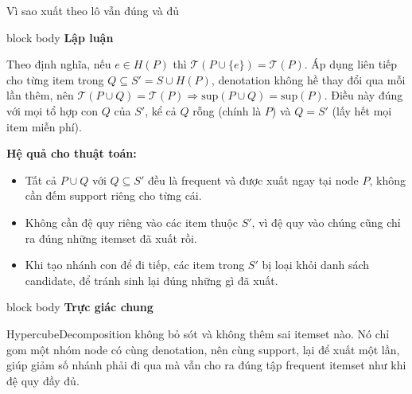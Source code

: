 \documentclass[9pt, aspectratio=169]{beamer}
\newenvironment{quietblock}[1]{%
  \begin{beamercolorbox}[wd=\linewidth,sep=5pt,rounded=true]{block body}
  {\color{psdearblue}\bfseries #1}\par\vspace{2pt}\footnotesize
}{%
  \end{beamercolorbox}
}
\begin{document}
\begin{frame}{Vì sao xuất theo lô vẫn đúng và đủ}
  \begin{quietblock}{Lập luận}
    Theo định nghĩa, nếu $e\in H(P)$ thì $\mathcal T(P\cup\{e\})=\mathcal
    T(P)$. Áp dụng liên tiếp cho từng item trong $Q\subseteq S'=S\cup H(P)$,
    denotation không hề thay đổi qua mỗi lần thêm, nên $\mathcal T(P\cup
    Q)=\mathcal T(P) \Rightarrow \mathrm{sup}(P\cup Q)=\mathrm{sup}(P)$.
    Điều này đúng với mọi tổ hợp con $Q$ của $S'$, kể cả $Q$ rỗng (chính là
    $P$) và $Q=S'$ (lấy hết mọi item miễn phí).
  \end{quietblock}

  \vspace{0.2cm}
  \small
  \textbf{Hệ quả cho thuật toán:}
  \begin{itemize}
    \item Tất cả $P\cup Q$ với $Q\subseteq S'$ đều là frequent và được xuất
      ngay tại node $P$, không cần đếm support riêng cho từng cái.
    \item Không cần đệ quy riêng vào các item thuộc $S'$, vì đệ quy vào
      chúng cũng chỉ ra đúng những itemset đã xuất rồi.
    \item Khi tạo nhánh con để đi tiếp, các item trong $S'$ bị loại khỏi
      danh sách candidate, để tránh sinh lại đúng những gì đã xuất.
  \end{itemize}

  \vspace{0.15cm}
  \begin{quietblock}{Trực giác chung}
    HypercubeDecomposition không bỏ sót và không thêm sai itemset nào. Nó
    chỉ gom một nhóm node có cùng denotation, nên cùng support, lại để xuất
    một lần, giúp giảm số nhánh phải đi qua mà vẫn cho ra đúng tập frequent
    itemset như khi đệ quy đầy đủ.
  \end{quietblock}
\end{frame}

\end{document}
